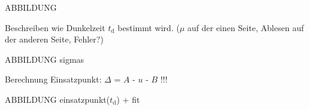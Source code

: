 ABBILDUNG

Beschreiben wie Dunkelzeit $t_\text{d}$ bestimmt wird.
($\mu$ auf der einen Seite, Ablesen auf der anderen Seite, Fehler?)

ABBILDUNG sigmas

Berechnung Einsatzpunkt: $\Delta$ = $A$ - $u$ - $B$ !!!

ABBILDUNG einsatzpunkt($t_\text{d}$) + fit

